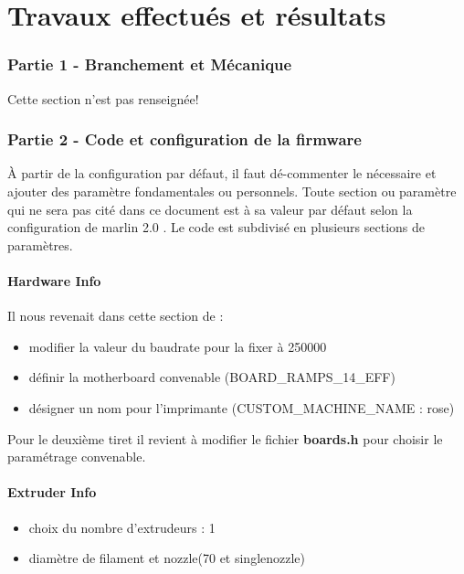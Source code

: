 \part{Travaux effectués et résultats}

\section{Partie 1 - Branchement et Mécanique}

Cette section n'est pas renseignée!
\section{Partie 2 - Code et configuration de la firmware}
À partir de la configuration par défaut, il faut dé-commenter le nécessaire et ajouter des paramètre fondamentales ou personnels. Toute section ou paramètre qui ne sera pas cité dans ce document est à sa valeur par défaut selon la configuration de marlin 2.0 .
Le code est subdivisé en plusieurs sections de paramètres.

\subsection{Hardware Info}
Il nous revenait dans cette section de : 
\begin{itemize}
	\item modifier la valeur du baudrate pour la fixer à 250000
	\item définir la motherboard convenable (BOARD\_RAMPS\_14\_EFF)
	\item désigner un nom pour l’imprimante (CUSTOM\_MACHINE\_NAME : rose)
\end{itemize}
Pour le deuxième tiret il revient à modifier le fichier \textbf{boards.h} pour choisir le paramétrage convenable.

\subsection{Extruder Info}
\begin{itemize}
	\item choix du nombre d'extrudeurs : 1
	\item diamètre de filament et nozzle\footnotemark (70 et singlenozzle)
\end{itemize}

